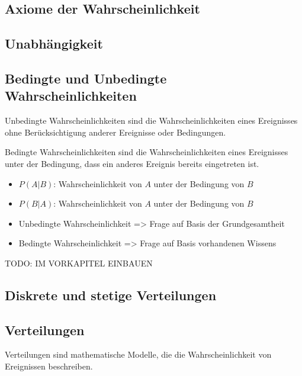 \documentclass[12pt]{scrartcl}
\begin{document}
\subsection{Axiome der Wahrscheinlichkeit}
\subsection{Unabhängigkeit}
\subsection{Bedingte und Unbedingte Wahrscheinlichkeiten}

Unbedingte Wahrscheinlichkeiten sind die Wahrscheinlichkeiten eines Ereignisses ohne
Berücksichtigung anderer Ereignisse oder Bedingungen. \par

Bedingte Wahrscheinlichkeiten sind die Wahrscheinlichkeiten eines Ereignisses unter der
Bedingung, dass ein anderes Ereignis bereits eingetreten ist.\par

\begin{itemize}
    \item $P(A|B)$: Wahrscheinlichkeit von $A$ unter der Bedingung von $B$
    \item $P(B|A)$: Wahrscheinlichkeit von $A$ unter der Bedingung von $B$
\end{itemize}

\begin{itemize}
    \item Unbedingte Wahrscheinlichkeit => Frage auf Basis der Grundgesamtheit
    \item Bedingte Wahrscheinlichkeit => Frage auf Basis vorhandenen Wissens
\end{itemize}

TODO: IM VORKAPITEL EINBAUEN

\pagebreak

\subsection{Diskrete und stetige Verteilungen}




\subsection{Verteilungen}

Verteilungen sind mathematische Modelle, die die Wahrscheinlichkeit von Ereignissen beschreiben.
\end{document}
